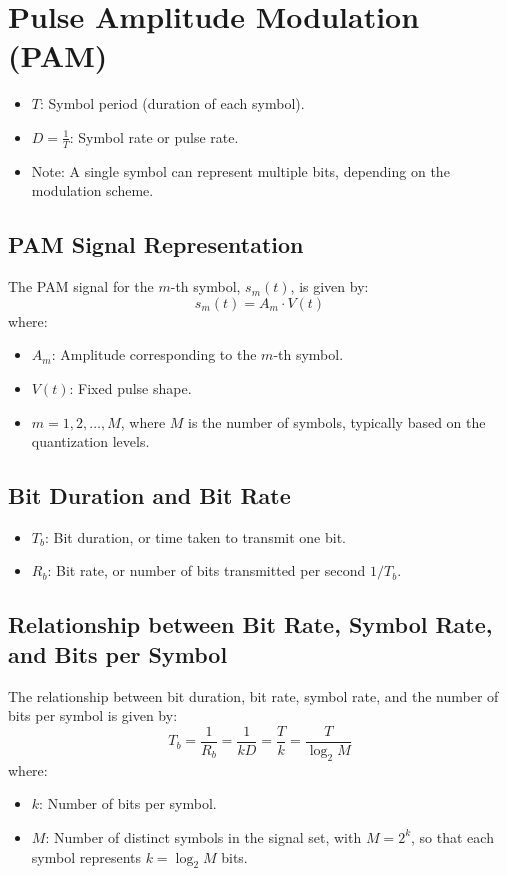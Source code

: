 \documentclass[10pt]{article}
\begin{document}
\section{Pulse Amplitude Modulation (PAM)}

\begin{itemize}
    \item \( T \): Symbol period (duration of each symbol).
    \item \( D = \frac{1}{T} \): Symbol rate or pulse rate.

    \item Note: A single symbol can represent multiple bits, depending on the modulation scheme.
\end{itemize}

\subsection{PAM Signal Representation}
The PAM signal for the \( m \)-th symbol, \( s_m(t) \), is given by:
\[
s_m(t) = A_m \cdot V(t)
\]
where:
\begin{itemize}
    \item \( A_m \): Amplitude corresponding to the \( m \)-th symbol.
    \item \( V(t) \): Fixed pulse shape.
    \item \( m = 1, 2, \dots, M \), where \( M \) is the number of symbols, typically based on the quantization levels.
\end{itemize}

\subsection{Bit Duration and Bit Rate}
\begin{itemize}
    \item \( T_b \): Bit duration, or time taken to transmit one bit.
    \item \( R_b \): Bit rate, or number of bits transmitted per second $1/T_b$.
\end{itemize}

\subsection{Relationship between Bit Rate, Symbol Rate, and Bits per Symbol}
The relationship between bit duration, bit rate, symbol rate, and the number of bits per symbol is given by:
\[
T_b = \frac{1}{R_b} = \frac{1}{kD} = \frac{T}{k} = \frac{T}{\log_2 M}
\]
where:
\begin{itemize}
    \item \( k \): Number of bits per symbol.
    \item \( M \): Number of distinct symbols in the signal set, with \( M = 2^k \), so that each symbol represents \( k = \log_2 M \) bits.
\end{itemize}
\end{document}
